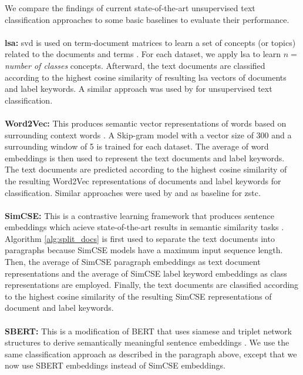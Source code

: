 \documentclass[sigconf]{acmart}
\begin{document}
We compare the findings of current state-of-the-art unsupervised text classification approaches to some basic baselines to evaluate their performance. \\ \\
\textbf{\ac{lsa}:} \ac{svd} is used on term-document matrices to learn a set of concepts (or topics) related to the documents and terms \cite{Deerwester1990IndexingBL}. For each dataset, we apply \ac{lsa} to learn $n=$ \textit{number of classes} concepts. Afterward, the text documents are classified according to the highest cosine similarity of resulting \ac{lsa} vectors of documents and label keywords. A similar approach was used by \citet{haj-yahia-etal-2019-towards} for unsupervised text classification.\\ \\
\textbf{Word2Vec:} This produces semantic vector representations of words based on surrounding context words \cite{NIPS2013_9aa42b31}. A Skip-gram model with a vector size of 300 and a surrounding window of 5 is trained for each dataset. The average of word embeddings is then used to represent the text documents and label keywords. The text documents are predicted according to the highest cosine similarity of the resulting Word2Vec representations of documents and label keywords for classification. Similar approaches were used by \citet{yin-etal-2019-benchmarking} and \citet{ye-etal-2020-zero} as baseline for \ac{zstc}.\\ \\
\textbf{SimCSE:} This is a contrastive learning framework that produces sentence embeddings which acieve state-of-the-art results in semantic similarity tasks \cite{gao-etal-2021-simcse}. Algorithm \ref{alg:split_docs} is first used to separate the text documents into paragraphs because SimCSE models have a maximum input sequence length. Then, the average of SimCSE paragraph embeddings as text document representations and the average of SimCSE label keyword embeddings as class representations are employed. Finally, the text documents are classified according to the highest cosine similarity of the resulting SimCSE representations of document and label keywords. \\ \\ 
\textbf{SBERT:} This is a modification of BERT \cite{devlin-etal-2019-bert} that uses siamese and triplet network structures to derive semantically meaningful sentence embeddings \cite{reimers-gurevych-2019-sentence}. We use the same classification approach as described in the paragraph above, except that we now use SBERT embeddings instead of SimCSE embeddings. 
\end{document}
